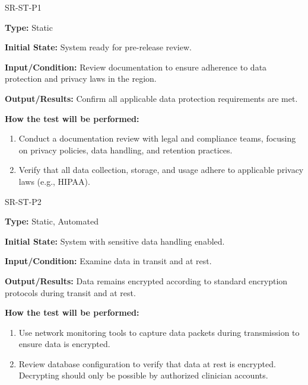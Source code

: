 \documentclass[12pt, titlepage]{article}
\begin{document}
\begin{itemize}
  \begin{item}
    SR-ST-P1
    \begin{mdframed}[linewidth=0.5mm]
      \textbf{Type:} Static \par
      \textbf{Initial State:} System ready for pre-release review. \par
      \textbf{Input/Condition:} Review documentation to ensure adherence to data protection and privacy laws in the region. \par
      \textbf{Output/Results:} Confirm all applicable data protection requirements are met. \par
      \textbf{How the test will be performed:}
      \begin{enumerate}[noitemsep]
        \item Conduct a documentation review with legal and compliance teams, focusing on privacy policies, data handling, and retention practices.
        \item Verify that all data collection, storage, and usage adhere to applicable privacy laws (e.g., HIPAA).
      \end{enumerate}
    \end{mdframed}
  \end{item}

  \begin{item}
    SR-ST-P2
    \begin{mdframed}[linewidth=0.5mm]
      \textbf{Type:} Static, Automated \par
      \textbf{Initial State:} System with sensitive data handling enabled. \par
      \textbf{Input/Condition:} Examine data in transit and at rest. \par
      \textbf{Output/Results:} Data remains encrypted according to standard encryption protocols during transit and at rest. \par
      \textbf{How the test will be performed:}
      \begin{enumerate}[noitemsep]
        \item Use network monitoring tools to capture data packets during transmission to ensure data is encrypted.
        \item Review database configuration to verify that data at rest is encrypted. \\ Decrypting should only be 
        possible by authorized clinician accounts.
      \end{enumerate}
    \end{mdframed}
  \end{item}


\end{itemize}
\end{document}
